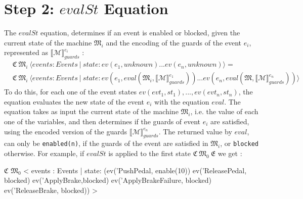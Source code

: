 \section{Step 2: $evalSt$ Equation}
The $evalSt$ equation, determines if an event is enabled or blocked, given the current state of the machine $\mathfrak{M}_i$ and the encoding of the guards of the event $e_i$, represented as $\llbracket \mathscr{M} \rrbracket^{e_i}_{guards}$ :
\begin{align*}
    &\mathfrak{C} \ \mathfrak{M}_{i} \ \langle events : Events \ | \ state: ev(e_1,unknown) ... ev(e_n, unknown) \rangle = \\
    &\mathfrak{C} \ \mathfrak{M}_{i} \ \langle events : Events \ | \ state: ev(e_1, eval(\mathfrak{M}_i, \llbracket \mathscr{M} \rrbracket^{e_1}_{guards})) ... ev(e_n, eval(\mathfrak{M}, \llbracket \mathscr{M} \rrbracket^{e_n}_{guards})) \rangle
\end{align*}
To do this, for each one of the event states $ev(evt_1,st_1), ..., ev(evt_n,st_n)$, the equation evaluates the new state of the event $e_i$ with the equation $eval$. The equation takes as input the current state of the machine $\mathfrak{M}_i$, i.e. the value of each one of the variables, and then determines if the guards of event $e_i$ are satisfied, using the encoded version of the guards  $\llbracket \mathscr{M} \rrbracket^{e_n}_{guards}$. The returned value by $eval$, can only be \texttt{enabled(n)}, if the guards of the event are satisfied in $\mathfrak{M}_i$, or \texttt{blocked} otherwise. For example, if $evalSt$ is applied to the first state $\mathfrak{C} \ \mathfrak{M}_{0}  \ \mathfrak{E}$ we get :
\begin{maude}

$\mathfrak{C}$ $\mathfrak{M}_0$ < events : Events | state: (ev('PushPedal, enable(10)) 
                                 ev('ReleasePedal, blocked) 
                                 ev('ApplyBrake,blocked) 
                                 ev('ApplyBrakeFailure, blocked)
                                 ev('ReleaseBrake, blocked)) >
\end{maude}



